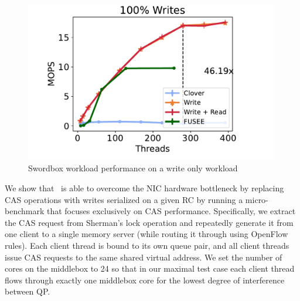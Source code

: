 \begin{figure}
    \center
    \includegraphics[width=0.99\textwidth]{fig/full_system_performance-d.pdf}
    \caption{Swordbox workload performance on a write only workload}
    \label{fig:full_system_performance-w}
\end{figure}


We show that \sword\ is able to overcome the NIC hardware
bottleneck by replacing CAS operations with writes
serialized on a given RC by running a micro-benchmark that
focuses exclusively on CAS performance. Specifically, we
extract the CAS request from Sherman's lock operation and
repeatedly generate it from one client to a single memory
server (while routing it through {\sword} using OpenFlow
rules).
Each client thread is bound to its own queue pair, and all
client threads issue CAS requests to the same shared virtual
address.  We set the number of cores on the {\sword}
middlebox to 24 so that in our maximal test case each client
thread flows through exactly one middlebox core for the
lowest degree of interference between QP.

